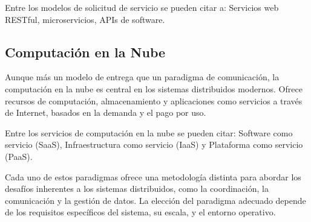 Entre los modelos de solicitud de servicio se pueden citar a: Servicios web RESTful, microservicios, APIs de software.

\subsection{Computación en la Nube}
Aunque más un modelo de entrega que un paradigma de comunicación, la computación en la nube es central en los sistemas distribuidos modernos. Ofrece recursos de computación, almacenamiento y aplicaciones como servicios a través de Internet, basados en la demanda y el pago por uso.

Entre los servicios de computación en la nube se pueden citar: Software como servicio (SaaS), Infraestructura como servicio (IaaS) y Plataforma como servicio (PaaS).

Cada uno de estos paradigmas ofrece una metodología distinta para abordar los desafíos inherentes a los sistemas distribuidos, como la coordinación, la comunicación y la gestión de datos. La elección del paradigma adecuado depende de los requisitos específicos del sistema, su escala, y el entorno operativo.


